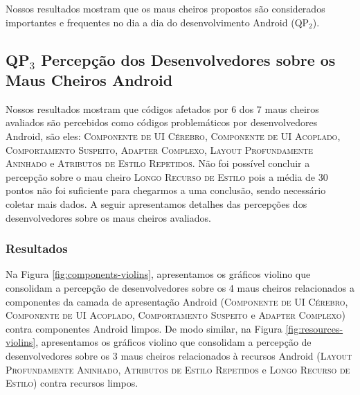 \begin{square}
  \small
  Nossos resultados mostram que os maus cheiros propostos são considerados importantes e frequentes no dia a dia do desenvolvimento Android (QP$_2$).
\end{square}




\subsection{QP$_3$ Percepção dos Desenvolvedores sobre os Maus Cheiros Android}
\label{phase3-results}

Nossos resultados mostram que códigos afetados por 6 dos 7 maus cheiros avaliados são percebidos como códigos problemáticos por desenvolvedores Android, são eles: \textsc{\small Componente de UI Cérebro}, \textsc{\small Componente de UI Acoplado}, \textsc{\small Comportamento Suspeito}, \textsc{\small Adapter Complexo}, \textsc{\small Layout Profundamente Aninhado} e \textsc{\small Atributos de Estilo Repetidos}. Não foi possível concluir a percepção sobre o mau cheiro \textsc{\small Longo Recurso de Estilo} pois a média de 30 pontos não foi suficiente para chegarmos a uma conclusão, sendo necessário coletar mais dados. A seguir apresentamos detalhes das percepções dos desenvolvedores sobre os maus cheiros avaliados.



\subsubsection{Resultados}
\label{sec:results-phase3}

Na Figura \ref{fig:components-violins}, apresentamos os gráficos violino que consolidam a percepção de desenvolvedores sobre os 4 maus cheiros relacionados a componentes da camada de apresentação Android (\textsc{\small Componente de UI Cérebro}, \textsc{\small Componente de UI Acoplado}, \textsc{\small Comportamento Suspeito} e \textsc{\small Adapter Complexo}) contra componentes Android limpos. De modo similar, na Figura \ref{fig:resources-violins}, apresentamos os gráficos violino que consolidam a percepção de desenvolvedores sobre os 3 maus cheiros relacionados à recursos Android (\textsc{\small Layout Profundamente Aninhado}, \textsc{\small Atributos de Estilo Repetidos} e \textsc{\small Longo Recurso de Estilo}) contra recursos limpos.

